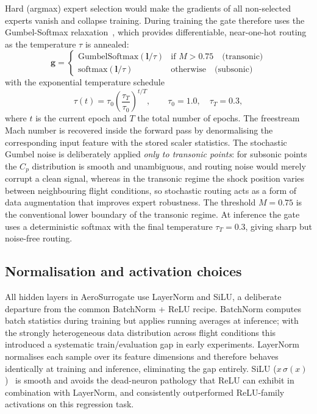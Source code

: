 \documentclass{WCCM-ECCOMAS_2026_Full_Paper}
\begin{document}
Hard (argmax) expert selection would make the gradients of all
non-selected experts vanish and collapse training.  During training
the gate therefore uses the Gumbel-Softmax
relaxation~\cite{Jang2017,Maddison2017}, which provides
differentiable, near-one-hot routing as the temperature $\tau$ is
annealed:
\begin{equation}
  \mathbf{g} =
  \begin{cases}
    \mathrm{GumbelSoftmax}(\mathbf{l}/\tau) & \text{if } M > 0.75
      \quad \text{(transonic)}\\[2pt]
    \mathrm{softmax}(\mathbf{l}/\tau)       & \text{otherwise}
      \quad \text{(subsonic)}
  \end{cases}
  \label{eq:routing}
\end{equation}
with the exponential temperature schedule
\begin{equation}
  \tau(t) = \tau_{0}\left(\frac{\tau_{T}}{\tau_{0}}\right)^{t/T},
  \qquad \tau_{0}=1.0,\quad \tau_{T}=0.3,
  \label{eq:tau}
\end{equation}
where $t$ is the current epoch and $T$ the total number of epochs.
The freestream Mach number is recovered inside the forward pass by
denormalising the corresponding input feature with the stored scaler
statistics.  The stochastic Gumbel noise is deliberately applied
\emph{only to transonic points}: for subsonic points the $C_p$
distribution is smooth and unambiguous, and routing noise would merely
corrupt a clean signal, whereas in the transonic regime the shock
position varies between neighbouring flight conditions, so stochastic
routing acts as a form of data augmentation that improves expert
robustness.  The threshold $M=0.75$ is the conventional lower boundary
of the transonic regime.  At inference the gate uses a deterministic
softmax with the final temperature $\tau_T=0.3$, giving sharp but
noise-free routing.

\subsection{Normalisation and activation choices}
\label{sec:norm}

All hidden layers in AeroSurrogate use LayerNorm and SiLU, a
deliberate departure from the common BatchNorm + ReLU recipe.
BatchNorm computes batch statistics during training but applies
running averages at inference; with the strongly heterogeneous data
distribution across flight conditions this introduced a systematic
train/evaluation gap in early experiments.  LayerNorm normalises each
sample over its feature dimensions and therefore behaves identically
at training and inference, eliminating the gap entirely.  SiLU
($x\,\sigma(x)$)~\cite{Elfwing2018,Ramachandran2017} is smooth and
avoids the dead-neuron pathology that ReLU can exhibit in combination
with LayerNorm, and consistently outperformed ReLU-family activations
on this regression task.
\end{document}
